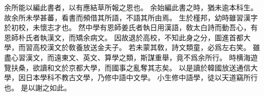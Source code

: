 余所能以編此書者，以有應結草所報之恩也。
余始編此書之時，猶未逾本科生。
故余所未學甚蕃，看書而頻借其所語，不語其所由焉。
生於槿邦，幼時雖習漢字於初校，未懷志才也。
然中學有恩師姜氏者執日用漢語，敎太白詩而動吾心，有恩師朴氏者執漢文，而矯余病文。
因故退於高校，不知此身之分，圖進首都大學，而習高校漢文於敎養放送金夫子。
若未蒙其敎，詩文類童，必爲左右笑。
雖盡心習漢文，而遠東文、英文、算學之類，斯謀重舉，竟不爲余所行。
時横海遊覽扶桑，欲讀和文於京都大學，而國事之亂奪其志矣。
以是讀於韓國放送通信大學，因日本學科不教古文學，乃修中語中文學。
小生修中語學，徒以天道竊所行也。
是以謝之如此。
